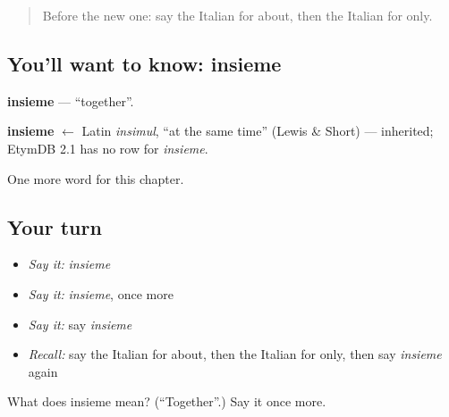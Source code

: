 \label{lesson:IT-C244-insieme}



\begin{quote}
Before the new one: say the Italian for about, then the Italian for only.
\end{quote}

\subsection*{You'll want to know: insieme}
\textbf{insieme} — \textquotedblleft{}together\textquotedblright{}.

\begin{cousinweb}
\textbf{insieme} $\leftarrow$ Latin \emph{insimul}, \textquotedblleft{}at the same time\textquotedblright{} (Lewis \& Short) — inherited; EtymDB 2.1 has no row for \emph{insieme}.
\end{cousinweb}

\begin{grammarlens}[title={What you've built}]
One more word for this chapter.
\end{grammarlens}

\subsection*{Your turn}
\begin{itemize}
\raggedright
  \item \emph{Say it:} \emph{insieme}
  \item \emph{Say it:} \emph{insieme}, once more
  \item \emph{Say it:} say \emph{insieme}
  \item \emph{Recall:} say the Italian for about, then the Italian for only, then say \emph{insieme} again
\end{itemize}

\begin{tcolorbox}[breakable,colback=teal!4,colframe=teal!35!black,title={Before you move on}]
What does insieme mean? (\textquotedblleft{}Together\textquotedblright{}.) Say it once more.
\end{tcolorbox}
